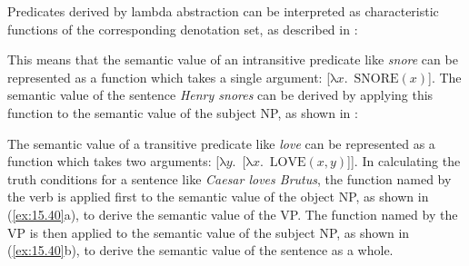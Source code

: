 Predicates derived by lambda abstraction can be interpreted as characteristic functions of the corresponding denotation set, as described in :


\ea \label{ex:15.38} 
\z 

This means that the semantic value of an intransitive predicate like \textit{snore} can be represented as a function which takes a single argument: [$x$.~$(x)$]. The semantic value of the sentence \textit{Henry snores} can be derived by applying this function to the semantic value of the subject NP, as shown in :


\ea \label{ex:15.39}
\z


The semantic value of a transitive predicate like \textit{love} can be represented as a function which takes two arguments: [$y$.~[$x$.~$(x,y)$]]. In calculating the truth conditions for a sentence like \textit{Caesar loves Brutus}, the function named by the verb is applied first to the semantic value of the object NP, as shown in (\ref{ex:15.40}a), to derive the semantic value of the VP. The function named by the VP is then applied to the semantic value of the subject NP, as shown in (\ref{ex:15.40}b), to derive the semantic value of the sentence as a whole.


